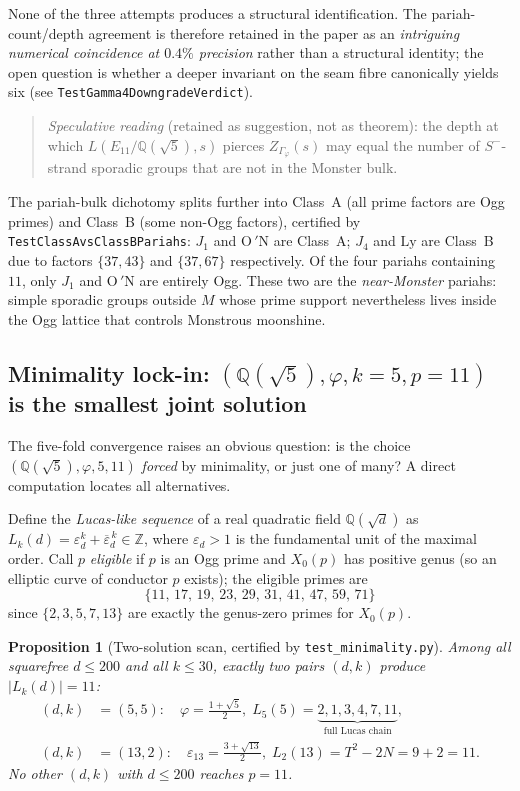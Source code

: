 \documentclass[11pt,a4paper]{article}
\theoremstyle{plain}
\newtheorem{proposition}[theorem]{Proposition}
\theoremstyle{definition}
\theoremstyle{remark}
\numberwithin{equation}{section}
\providecommand{\Qp}{\ensuremath{\mathbb{Q}(\sqrt{5})}}
\providecommand{\Gphi}{\ensuremath{\Gamma_{\varphi}}}
\begin{document}
None of the three attempts produces a structural identification.
The pariah-count/depth agreement is therefore retained in the paper
as an \emph{intriguing numerical coincidence at $0.4\%$ precision}
rather than a structural identity; the open question is whether a
deeper invariant on the seam fibre canonically yields six (see
\texttt{TestGamma4DowngradeVerdict}).

\begin{quote}
\emph{Speculative reading} (retained as suggestion, not as theorem):
the depth at which $L(E_{11}/\Qp,s)$ pierces $Z_{\Gphi}(s)$ may equal the
number of $S^{-}$-strand sporadic groups that are not in the Monster bulk.
\end{quote}

The pariah-bulk dichotomy splits further into Class~A (all prime factors are
Ogg primes) and Class~B (some non-Ogg factors), certified by
\texttt{TestClassAvsClassBPariahs}: $J_{1}$ and $\mathrm{O\,'\!N}$ are Class~A;
$J_{4}$ and $\mathrm{Ly}$ are Class~B due to factors $\{37,43\}$ and $\{37,67\}$
respectively.  Of the four pariahs containing $11$, only $J_{1}$ and $\mathrm{O\,'\!N}$
are entirely Ogg.  These two are the \emph{near-Monster} pariahs: simple
sporadic groups outside $M$ whose prime support nevertheless lives inside
the Ogg lattice that controls Monstrous moonshine.

\subsection*{Minimality lock-in: $(\Qp,\varphi,k=5,p=11)$ is the smallest joint solution}
\label{sec:minimality-lock}

The five-fold convergence raises an obvious question: is the choice
$(\Qp,\varphi,5,11)$ \emph{forced} by minimality, or just one of many?
A direct computation locates all alternatives.

Define the \emph{Lucas-like sequence} of a real quadratic field $\mathbb{Q}(\sqrt{d})$ as
$L_{k}(d)=\varepsilon_{d}^{k}+\overline{\varepsilon}_{d}^{\,k}\in\mathbb{Z}$,
where $\varepsilon_{d}>1$ is the fundamental unit of the maximal order.  Call $p$
\emph{eligible} if $p$ is an Ogg prime and $X_{0}(p)$ has positive genus
(so an elliptic curve of conductor $p$ exists); the eligible primes are
\[
  \{11,\,17,\,19,\,23,\,29,\,31,\,41,\,47,\,59,\,71\}
\]
since $\{2,3,5,7,13\}$ are exactly the genus-zero primes for $X_{0}(p)$.

\begin{proposition}[Two-solution scan, certified by \texttt{test\_minimality.py}]\label{prop:two-solutions}
  Among all squarefree $d\le 200$ and all $k\le 30$, exactly \emph{two} pairs
  $(d,k)$ produce $|L_{k}(d)|=11$:
  \begin{align}
    (d,k)&=(5,5):\quad
      \varphi=\tfrac{1+\sqrt{5}}{2},\;
      L_{5}(5) = \underbrace{2,1,3,4,7,11}_{\text{full Lucas chain}}, \\
    (d,k)&=(13,2):\quad
      \varepsilon_{13}=\tfrac{3+\sqrt{13}}{2},\;
      L_{2}(13) = T^{2}-2N = 9+2 = 11.
  \end{align}
  No other $(d,k)$ with $d\le 200$ reaches $p=11$.
\end{proposition}
\end{document}
